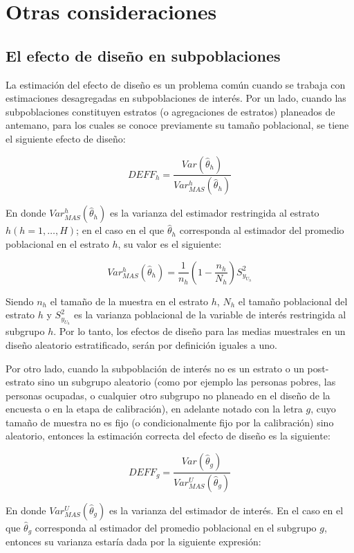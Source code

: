 \documentclass[
  12pt,
]{book}
\begin{document}
\hypertarget{otras-consideraciones}{%
\section{Otras consideraciones}\label{otras-consideraciones}}

\hypertarget{el-efecto-de-diseuxf1o-en-subpoblaciones}{%
\subsection{El efecto de diseño en subpoblaciones}\label{el-efecto-de-diseuxf1o-en-subpoblaciones}}

La estimación del efecto de diseño es un problema común cuando se trabaja con estimaciones desagregadas en subpoblaciones de interés. Por un lado, cuando las subpoblaciones constituyen estratos (o agregaciones de estratos) planeados de antemano, para los cuales se conoce previamente su tamaño poblacional, se tiene el siguiente efecto de diseño:

\[
DEFF_h= \frac{Var (\hat\theta_h) }{Var_{MAS}^h(\hat\theta_h) }
\]

En donde \(Var_{MAS}^h(\hat\theta_h)\) es la varianza del estimador restringida al estrato \(h (h=1,\ldots, H)\); en el caso en el que \(\hat\theta_h\) corresponda al estimador del promedio poblacional en el estrato \(h\), su valor es el siguiente:

\[
Var_{MAS}^h(\hat\theta_h)=\frac{1}{n_h}\left(1-\frac{n_h}{N_h}\right)S^2_{y_{U_h}}
\]

Siendo \(n_h\) el tamaño de la muestra en el estrato \(h\), \(N_h\) el tamaño poblacional del estrato \(h\) y \(S^2_{y_{U_h}}\) es la varianza poblacional de la variable de interés restringida al subgrupo \(h\). Por lo tanto, los efectos de diseño para las medias muestrales en un diseño aleatorio estratificado, serán por definición iguales a uno.

Por otro lado, cuando la subpoblación de interés no es un estrato o un post-estrato sino un subgrupo aleatorio (como por ejemplo las personas pobres, las personas ocupadas, o cualquier otro subgrupo no planeado en el diseño de la encuesta o en la etapa de calibración), en adelante notado con la letra \(g\), cuyo tamaño de muestra no es fijo (o condicionalmente fijo por la calibración) sino aleatorio, entonces la estimación correcta del efecto de diseño es la siguiente:

\[
DEFF_g = \frac{Var (\hat\theta_g) }{Var_{MAS}^U(\hat\theta_g) }
\]

En donde \(Var_{MAS}^U(\hat\theta_g)\) es la varianza del estimador de interés. En el caso en el que \(\hat\theta_g\) corresponda al estimador del promedio poblacional en el subgrupo \(g\), entonces su varianza estaría dada por la siguiente expresión:
\end{document}

